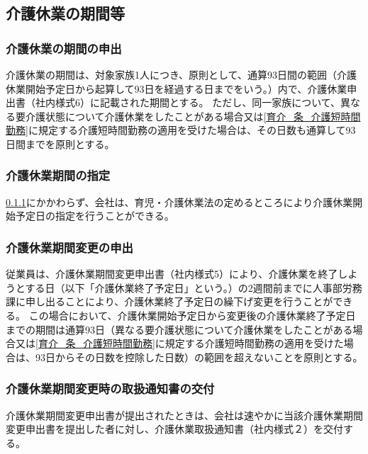 \documentclass{jsarticle}
\begin{document}
\subsection{介護休業の期間等}
\label{育介_条_介護休業の期間等}

\subsubsection{介護休業の期間の申出}
\label{育介_項_介護休業の期間の申出}
介護休業の期間は、対象家族1人につき、原則として、通算93日間の範囲（介護休業開始予定日から起算して93日を経過する日までをいう。）内で、介護休業申出書（社内様式6）に記載された期間とする。
ただし、同一家族について、異なる要介護状態について介護休業をしたことがある場合又は\ref{育介_条_介護短時間勤務}に規定する介護短時間勤務の適用を受けた場合は、その日数も通算して93日間までを原則とする。

\subsubsection{介護休業期間の指定}
\label{育介_項_介護休業期間の指定}
\ref{育介_項_介護休業の期間の申出}にかかわらず、会社は、育児・介護休業法の定めるところにより介護休業開始予定日の指定を行うことができる。 

\subsubsection{介護休業期間変更の申出}
\label{育介_項_介護休業期間変更の申出}
従業員は、介護休業期間変更申出書（社内様式5）により、介護休業を終了しようとする日（以下「介護休業終了予定日」という。）の2週間前までに人事部労務課に申し出ることにより、介護休業終了予定日の繰下げ変更を行うことができる。
この場合において、介護休業開始予定日から変更後の介護休業終了予定日までの期間は通算93日（異なる要介護状態について介護休業をしたことがある場合又は\ref{育介_条_介護短時間勤務}に規定する介護短時間勤務の適用を受けた場合は、93日からその日数を控除した日数）の範囲を超えないことを原則とする。 

\subsubsection{介護休業期間変更時の取扱通知書の交付}
\label{育介_項_介護休業期間変更時の取扱通知書の交付}
介護休業期間変更申出書が提出されたときは、会社は速やかに当該介護休業期間変更申出書を提出した者に対し、介護休業取扱通知書（社内様式２）を交付する。 
\end{document}
